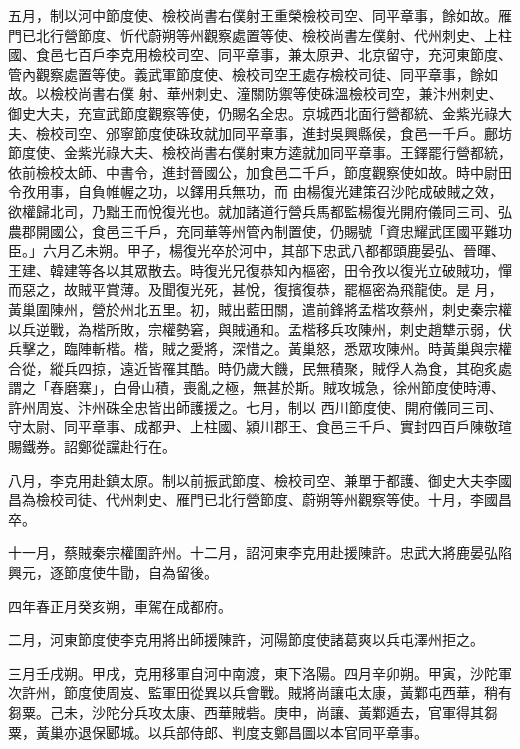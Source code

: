 \begin{pinyinscope}
 五月，制以河中節度使、檢校尚書右僕射王重榮檢校司空、同平章事，餘如故。雁門已北行營節度、忻代蔚朔等州觀察處置等使、檢校尚書左僕射、代州刺史、上柱國、食邑七百戶李克用檢校司空、同平章事，兼太原尹、北京留守，充河東節度、管內觀察處置等使。義武軍節度使、檢校司空王處存檢校司徒、同平章事，餘如故。以檢校尚書右僕
 射、華州刺史、潼關防禦等使硃溫檢校司空，兼汴州刺史、御史大夫，充宣武節度觀察等使，仍賜名全忠。京城西北面行營都統、金紫光祿大夫、檢校司空、邠寧節度使硃玫就加同平章事，進封吳興縣侯，食邑一千戶。鄜坊節度使、金紫光祿大夫、檢校尚書右僕射東方逵就加同平章事。王鐸罷行營都統，依前檢校太師、中書令，進封晉國公，加食邑二千戶，節度觀察使如故。時中尉田令孜用事，自負帷幄之功，以鐸用兵無功，而
 由楊復光建策召沙陀成破賊之效，欲權歸北司，乃黜王而悅復光也。就加諸道行營兵馬都監楊復光開府儀同三司、弘農郡開國公，食邑三千戶，充同華等州管內制置使，仍賜號「資忠耀武匡國平難功臣。」六月乙未朔。甲子，楊復光卒於河中，其部下忠武八都都頭鹿晏弘、晉暉、王建、韓建等各以其眾散去。時復光兄復恭知內樞密，田令孜以復光立破賊功，憚而惡之，故賊平賞薄。及聞復光死，甚悅，復擯復恭，罷樞密為飛龍使。是
 月，黃巢圍陳州，營於州北五里。初，賊出藍田關，遣前鋒將孟楷攻蔡州，刺史秦宗權以兵逆戰，為楷所敗，宗權勢窘，與賊通和。孟楷移兵攻陳州，刺史趙犨示弱，伏兵擊之，臨陣斬楷。楷，賊之愛將，深惜之。黃巢怒，悉眾攻陳州。時黃巢與宗權合從，縱兵四掠，遠近皆罹其酷。時仍歲大饑，民無積聚，賊俘人為食，其砲炙處謂之「舂磨寨」，白骨山積，喪亂之極，無甚於斯。賊攻城急，徐州節度使時溥、許州周岌、汴州硃全忠皆出師護援之。七月，制以
 西川節度使、開府儀同三司、守太尉、同平章事、成都尹、上柱國、潁川郡王、食邑三千戶、實封四百戶陳敬瑄賜鐵券。詔鄭從讜赴行在。



 八月，李克用赴鎮太原。制以前振武節度、檢校司空、兼單于都護、御史大夫李國昌為檢校司徒、代州刺史、雁門已北行營節度、蔚朔等州觀察等使。十月，李國昌卒。



 十一月，蔡賊秦宗權圍許州。十二月，詔河東李克用赴援陳許。忠武大將鹿晏弘陷興元，逐節度使牛勖，自為留後。



 四年春正月癸亥朔，車駕在成都府。



 二月，河東節度使李克用將出師援陳許，河陽節度使諸葛爽以兵屯澤州拒之。



 三月壬戌朔。甲戌，克用移軍自河中南渡，東下洛陽。四月辛卯朔。甲寅，沙陀軍次許州，節度使周岌、監軍田從異以兵會戰。賊將尚讓屯太康，黃鄴屯西華，稍有芻粟。己未，沙陀分兵攻太康、西華賊砦。庚申，尚讓、黃鄴遁去，官軍得其芻粟，黃巢亦退保郾城。以兵部侍郎、判度支鄭昌圖以本官同平章事。




\end{pinyinscope}
